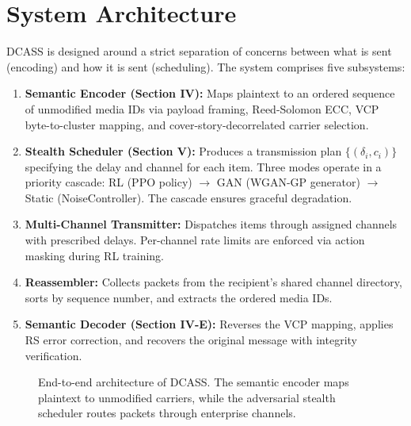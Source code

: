 \documentclass[conference]{IEEEtran}
\begin{document}
\section{System Architecture}

DCASS is designed around a strict separation of concerns between what is sent (encoding) and how it is sent (scheduling). The system comprises five subsystems:
\begin{enumerate}
    \item \textbf{Semantic Encoder (Section IV):} Maps plaintext to an ordered sequence of unmodified media IDs via payload framing, Reed-Solomon ECC, VCP byte-to-cluster mapping, and cover-story-decorrelated carrier selection.
    \item \textbf{Stealth Scheduler (Section V):} Produces a transmission plan $\{(\delta_i, c_i)\}$ specifying the delay and channel for each item. Three modes operate in a priority cascade: RL (PPO policy) $\to$ GAN (WGAN-GP generator) $\to$ Static (NoiseController). The cascade ensures graceful degradation.
    \item \textbf{Multi-Channel Transmitter:} Dispatches items through assigned channels with prescribed delays. Per-channel rate limits are enforced via action masking during RL training.
    \item \textbf{Reassembler:} Collects packets from the recipient's shared channel directory, sorts by sequence number, and extracts the ordered media IDs.
    \item \textbf{Semantic Decoder (Section IV-E):} Reverses the VCP mapping, applies RS error correction, and recovers the original message with integrity verification.
\end{enumerate}


\begin{figure}[t]
\centering
{}
\caption{End-to-end architecture of DCASS. The semantic encoder maps plaintext to unmodified carriers, while the adversarial stealth scheduler routes packets through enterprise channels.}
\label{fig:arch}
\end{figure}
\end{document}
